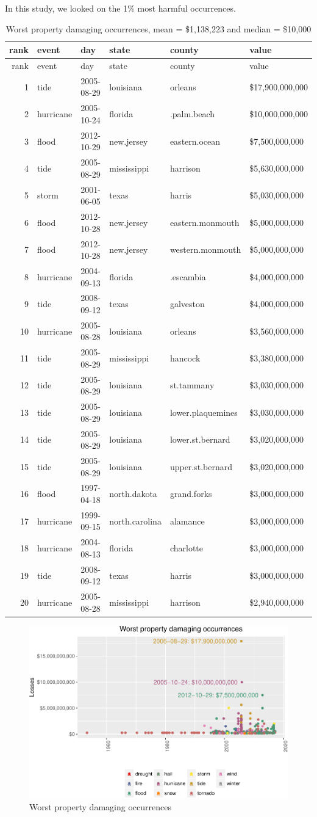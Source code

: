 \documentclass[]{article}
\begin{document}
In this study, we looked on the 1\% most harmful occurrences.

\begin{longtable}[]{@{}rlllll@{}}
\caption{Worst property damaging occurrences, mean = \$1,138,223 and
median = \$10,000}\tabularnewline
\toprule
rank & event & day & state & county & value\tabularnewline
\midrule
\endfirsthead
\toprule
rank & event & day & state & county & value\tabularnewline
\midrule
\endhead
1 & tide & 2005-08-29 & louisiana & orleans &
\$17,900,000,000\tabularnewline
2 & hurricane & 2005-10-24 & florida & .palm.beach &
\$10,000,000,000\tabularnewline
3 & flood & 2012-10-29 & new.jersey & eastern.ocean &
\$7,500,000,000\tabularnewline
4 & tide & 2005-08-29 & mississippi & harrison &
\$5,630,000,000\tabularnewline
5 & storm & 2001-06-05 & texas & harris & \$5,030,000,000\tabularnewline
6 & flood & 2012-10-28 & new.jersey & eastern.monmouth &
\$5,000,000,000\tabularnewline
7 & flood & 2012-10-28 & new.jersey & western.monmouth &
\$5,000,000,000\tabularnewline
8 & hurricane & 2004-09-13 & florida & .escambia &
\$4,000,000,000\tabularnewline
9 & tide & 2008-09-12 & texas & galveston &
\$4,000,000,000\tabularnewline
10 & hurricane & 2005-08-28 & louisiana & orleans &
\$3,560,000,000\tabularnewline
11 & tide & 2005-08-29 & mississippi & hancock &
\$3,380,000,000\tabularnewline
12 & tide & 2005-08-29 & louisiana & st.tammany &
\$3,030,000,000\tabularnewline
13 & tide & 2005-08-29 & louisiana & lower.plaquemines &
\$3,030,000,000\tabularnewline
14 & tide & 2005-08-29 & louisiana & lower.st.bernard &
\$3,020,000,000\tabularnewline
15 & tide & 2005-08-29 & louisiana & upper.st.bernard &
\$3,020,000,000\tabularnewline
16 & flood & 1997-04-18 & north.dakota & grand.forks &
\$3,000,000,000\tabularnewline
17 & hurricane & 1999-09-15 & north.carolina & alamance &
\$3,000,000,000\tabularnewline
18 & hurricane & 2004-08-13 & florida & charlotte &
\$3,000,000,000\tabularnewline
19 & tide & 2008-09-12 & texas & harris & \$3,000,000,000\tabularnewline
20 & hurricane & 2005-08-28 & mississippi & harrison &
\$2,940,000,000\tabularnewline
\bottomrule
\end{longtable}

\begin{figure}[htbp]
\centering
\includegraphics{readme_files/figure-latex/prop-single-plot-1.pdf}
\caption{Worst property damaging occurrences}
\end{figure}
\end{document}
